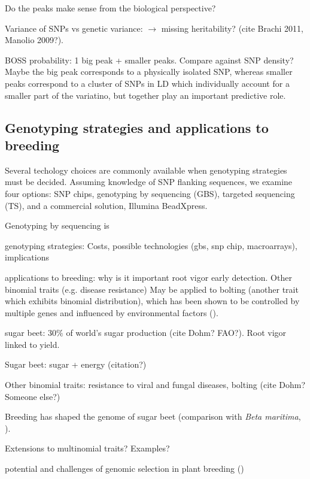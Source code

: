 Do the peaks make sense from the biological perspective?

Variance of SNPs vs genetic variance: $\rightarrow$ missing
heritability? (cite Brachi 2011, Manolio 2009?).

BOSS probability: 1 big peak + smaller peaks. Compare against SNP
density? Maybe the big peak corresponds to a physically isolated SNP,
whereas smaller peaks correspond to a cluster of SNPs in LD which
individually account for a smaller part of the variatino, but together
play an important predictive role. 


\subsection{Genotyping strategies and applications to breeding}
Several techology choices are commonly available when genotyping strategies
must be decided. Assuming knowledge of SNP flanking sequences, we examine
four options: SNP chips, genotyping by sequencing (GBS), targeted sequencing (TS),
and a commercial solution, Illumina BeadXpress.


Genotyping by sequencing is 

genotyping strategies: 
Costs, possible technologies (gbs, snp chip, macroarrays), implications

applications to breeding:
why is it important root vigor early detection. Other binomial traits (e.g.
disease resistance) May be applied to bolting (another trait which
exhibits binomial distribution), which has been shown to be controlled
by multiple genes and influenced by environmental factors
(\cite{salah2012genetic}).

sugar beet: $30\%$ of world's sugar production (cite Dohm? FAO?). Root
vigor linked to yield.

Sugar beet: sugar + energy (citation?)

Other binomial traits: resistance to viral and fungal diseases, bolting
(cite Dohm? Someone else?)

Breeding has shaped the genome of sugar beet (comparison with \emph{Beta
  maritima}, \cite{dohm2013genome}).

Extensions to multinomial traits? Examples?

potential and challenges of genomic selection in plant breeding (\cite{jonas2013does})

%

